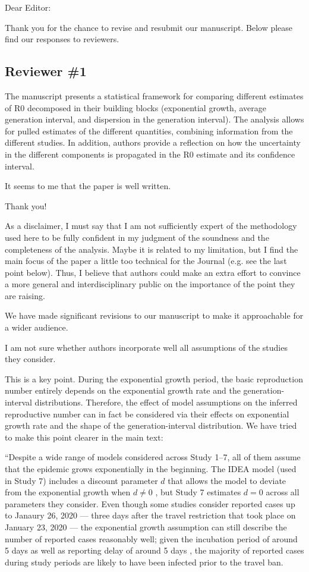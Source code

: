 \documentclass[12pt]{article}
\newcommand{\rev}{\subsection*}
\newcommand{\revtext}{\textsf}
\begin{document}
\noindent Dear Editor:

Thank you for the chance to revise and resubmit our manuscript. 
Below please find our responses to reviewers.

\rev{Reviewer \#1}

\revtext{
The manuscript presents a statistical framework for comparing different estimates of R0 decomposed in their building blocks (exponential growth, average generation interval, and dispersion in the generation interval). The analysis allows for pulled estimates of the different quantities, combining information from the different studies. In addition, authors provide a reflection on how the uncertainty in the different components is propagated in the R0 estimate and its confidence interval.}

\revtext{It seems to me that the paper is well written.}

Thank you!

\revtext{As a disclaimer, I must say that I am not sufficiently expert of the methodology used here to be fully confident in my judgment of the soundness and the completeness of the analysis. Maybe it is related to my limitation, but I find the main focus of the paper a little too technical for the Journal (e.g. see the last point below). Thus, I believe that authors could make an extra effort to convince a more general and interdisciplinary public on the importance of the point they are raising.}

We have made significant revisions to our manuscript to make it approachable for a wider audience.

\revtext{I am not sure whether authors incorporate well all assumptions of the studies they consider.} 

This is a key point. During the exponential growth period, the basic reproduction number entirely depends on the exponential growth rate and the generation-interval distributions.
Therefore, the effect of model assumptions on the inferred reproductive number can in fact be considered via their effects on exponential growth rate and the shape of the generation-interval distribution.
We have tried to make this point clearer in the main text:

``Despite a wide range of models considered across Study 1--7, all of them assume that the epidemic grows exponentially in the beginning.
The IDEA model (used in Study 7) includes a discount parameter $d$ that allows the model to deviate from the exponential growth when $d \neq 0$ \citep{fisman2013idea}, but Study 7 estimates $d=0$ across all parameters they consider.
Even though some studies consider reported cases up to Janaury 26, 2020 --- three days after the travel restriction that took place on January 23, 2020 \citep{Tianeabb6105} --- the exponential growth assumption can still describe the number of reported cases reasonably well;
given the incubation period of around 5 days \citep{lauer2020incubation} as well as reporting delay of around 5 days \citep{sun2020early}, the majority of reported cases during study periods are likely to have been infected prior to the travel ban.
\end{document}

